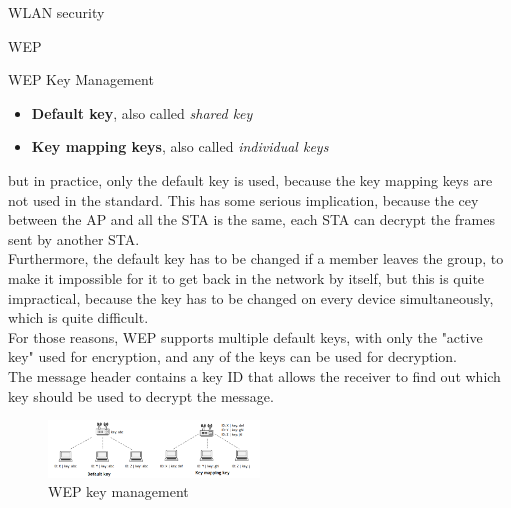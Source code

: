 \begin{section}{WLAN security}
\begin{subsection}{WEP}
\begin{subsubsection}{WEP Key Management}
      \begin{itemize}
        \item \textbf{Default key}, also called \textit{shared key}
        \item \textbf{Key mapping keys}, also called \textit{individual keys}
      \end{itemize}
      but in practice, only the default key is used, because the key mapping keys are not used in the
      standard. This has some serious implication, because the cey between the AP and all the STA 
      is the same, each STA can decrypt the frames sent by another STA.\\
      Furthermore, the default key has to be changed if a member leaves the group, to make it impossible
      for it to get back in the network by itself, but this is quite impractical, because the 
      key has to be changed on every device simultaneously, which is quite difficult.\\
      For those reasons, WEP supports multiple default keys, with only the "active key" used for encryption, 
      and any of the keys can be used for decryption.\\
      The message header contains a key ID that allows the receiver to find out which key should be used
      to decrypt the message.

      \begin{figure}[h]
        \centering
        \includegraphics[width=0.5\textwidth]{img/wireless/WEP key management.png}
        \caption{WEP key management}
      \end{figure}


\end{subsubsection}
\end{subsection}
\end{section}
